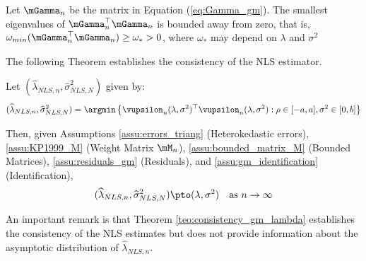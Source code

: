 \documentclass[english,12pt]{book}\usepackage[]{graphicx}\usepackage[]{xcolor}
\begin{document}
\begin{assumption}\label{assu:gm_identification} Let $\mGamma_n$ be the matrix in Equation (\ref{eq:Gamma_gm}). The smallest eigenvalues of $\mGamma^\top_n\mGamma_n$ is bounded away from zero, that is, $\omega_{min} (\mGamma^\top_n\mGamma_n) \geq \omega_* > 0$, where $\omega_*$ may depend on $\lambda$ and $\sigma^2$
\end{assumption}

The following Theorem establishes the consistency of the NLS estimator. 

\begin{theorem}[Consistency]\label{teo:consistency_gm_lambda}
Let $(\widehat{\lambda}_{NLS, n}, \widehat{\sigma}^2_{NLS, N})$ given by:
\begin{equation*}
  (\widehat{\lambda}_{NLS, n}, \widehat{\sigma}^2_{NLS, N}) = \argmin \left\lbrace \vupsilon_n(\lambda, \sigma^2)^\top\vupsilon_n(\lambda, \sigma^2): \rho \in [-a, a], \sigma^2\in [0, b]\right\rbrace 
\end{equation*}

Then, given Assumptions \ref{assu:errors_triang} (Heterokedastic errors), \ref{assu:KP1999_M} (Weight Matrix $\mM_n$), \ref{assu:bounded_matrix_M} (Bounded Matrices), \ref{assu:residuals_gm} (Residuals), and \ref{assu:gm_identification} (Identification),
\begin{equation*}
(\widehat{\lambda}_{NLS, n}, \widehat{\sigma}^2_{NLS, N})  \pto (\lambda, \sigma^2)\quad \mbox{as $n\to \infty$}
\end{equation*}
\end{theorem}

An important remark is that Theorem \ref{teo:consistency_gm_lambda} establishes the consistency of the NLS estimates but does not provide information about the asymptotic distribution of  $\widehat{\lambda}_{NLS, n}$.
\end{document}
